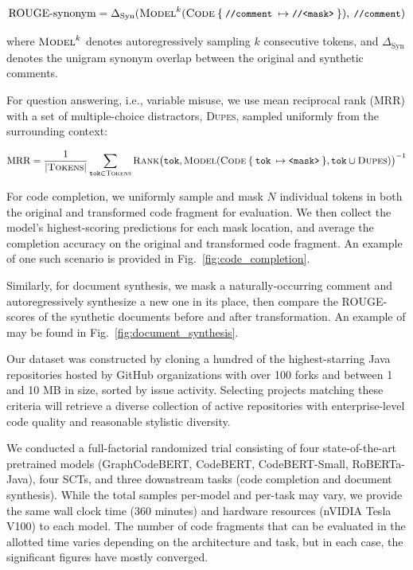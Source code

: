 \documentclass[usenames,dvipsnames]{article} %
\begin{document}
  \begin{equation*}
    \text{ROUGE-synonym} = \Delta_{\text{Syn}}(\textsc{Model}^{k}(\textsc{Code}\:\{\:\small{\texttt{//comment}}\:\mapsto\texttt{//<mask>}\:\}), \:\texttt{//comment})
  \end{equation*}

  where $\textsc{Model}^{k}$ denotes autoregressively sampling $k$ consecutive tokens, and $\Delta_\text{Syn}$ denotes the unigram synonym overlap between the original and synthetic comments.

  For question answering, i.e., variable misuse, we use mean reciprocal rank (MRR) with a set of multiple-choice distractors, \textsc{Dupes}, sampled uniformly from the surrounding context:

  \begin{equation*}
    \text{MRR} = \frac{1}{|\textsc{Tokens}|} \sum_{\texttt{tok}\in\textsc{Tokens}} \textsc{Rank}\big(\texttt{tok}, \textsc{Model}(\textsc{Code}\:\{\:\texttt{tok}\:\mapsto\texttt{<mask>}\:\}, \texttt{tok}\cup\textsc{Dupes})\big)^{-1}
  \end{equation*}

  For code completion, we uniformly sample and mask $N$ individual tokens in both the original and transformed code fragment for evaluation. We then collect the model's highest-scoring predictions for each mask location, and average the completion accuracy on the original and transformed code fragment. An example of one such scenario is provided in Fig.~\ref{fig:code_completion}.

  Similarly, for document synthesis, we mask a naturally-occurring comment and autoregressively synthesize a new one in its place, then compare the ROUGE-scores of the synthetic documents before and after transformation. An example of may be found in Fig.~\ref{fig:document_synthesis}.

  Our dataset was constructed by cloning a hundred of the highest-starring Java repositories hosted by GitHub organizations with over 100 forks and between 1 and 10 MB in size, sorted by issue activity. Selecting projects matching these criteria will retrieve a diverse collection of active repositories with enterprise-level code quality and reasonable stylistic diversity.

  We conducted a full-factorial randomized trial consisting of four state-of-the-art pretrained models (GraphCodeBERT, CodeBERT, CodeBERT-Small, RoBERTa-Java), four SCTs, and three downstream tasks (code completion and document synthesis). While the total samples per-model and per-task may vary, we provide the same wall clock time (360 minutes) and hardware resources (nVIDIA Tesla V100) to each model. The number of code fragments that can be evaluated in the allotted time varies depending on the architecture and task, but in each case, the significant figures have mostly converged.
\end{document}

